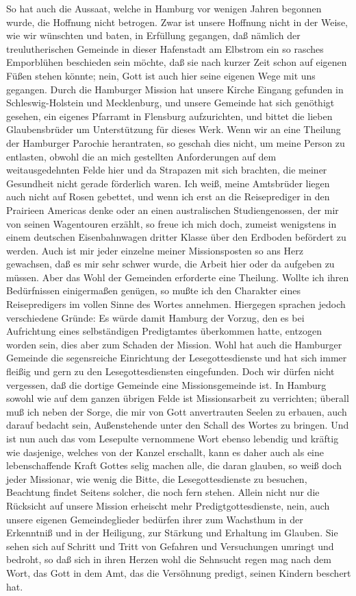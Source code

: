 So hat auch die Aussaat, welche in Hamburg vor wenigen Jahren begonnen wurde, die Hoffnung nicht betrogen. Zwar ist unsere Hoffnung nicht in der Weise, wie wir wünschten und baten, in Erfüllung gegangen, daß nämlich der treulutherischen Gemeinde in dieser Hafenstadt am Elbstrom ein so rasches Emporblühen beschieden sein möchte, daß sie nach kurzer Zeit schon auf eigenen Füßen stehen könnte; nein, Gott ist auch hier seine eigenen Wege mit uns gegangen. Durch die Hamburger Mission hat unsere Kirche Eingang gefunden in Schleswig-Holstein und Mecklenburg, und unsere Gemeinde hat sich genöthigt gesehen, ein eigenes Pfarramt in Flensburg aufzurichten, und bittet die lieben Glaubensbrüder um Unterstützung für dieses Werk. Wenn wir an eine Theilung der Hamburger Parochie herantraten, so geschah dies nicht, um meine Person zu entlasten, obwohl die an mich gestellten Anforderungen auf dem weitausgedehnten Felde hier und da Strapazen mit sich brachten, die meiner Gesundheit nicht gerade förderlich waren. Ich weiß, meine Amtsbrüder liegen auch nicht auf Rosen gebettet, und wenn ich erst an die Reiseprediger in den Prairieen Americas denke oder an einen australischen Studiengenossen, der mir von seinen Wagentouren erzählt, so freue ich mich doch, zumeist wenigstens in einem deutschen Eisenbahnwagen dritter Klasse über den Erdboden befördert zu werden. Auch ist mir jeder einzelne meiner Missionsposten so ans Herz gewachsen, daß es mir sehr schwer wurde, die Arbeit hier oder da aufgeben zu müssen. Aber das Wohl der Gemeinden erforderte eine Theilung. Wollte ich ihren Bedürfnissen einigermaßen genügen, so mußte ich den Charakter eines Reisepredigers im vollen Sinne des Wortes annehmen. Hiergegen sprachen jedoch verschiedene Gründe: Es würde damit Hamburg der Vorzug, den es bei Aufrichtung eines selbständigen Predigtamtes überkommen hatte, entzogen worden sein, dies aber zum Schaden der Mission. Wohl hat auch die Hamburger Gemeinde die segensreiche Einrichtung der Lesegottesdienste und hat sich immer fleißig und gern zu den Lesegottesdiensten eingefunden. Doch wir dürfen nicht vergessen, daß die dortige Gemeinde eine Missionsgemeinde ist. In Hamburg sowohl wie auf dem ganzen übrigen Felde ist Missionsarbeit zu verrichten; überall muß ich neben der Sorge, die mir von Gott anvertrauten Seelen zu erbauen, auch darauf bedacht sein, Außenstehende unter den Schall des Wortes zu bringen. Und ist nun auch das vom Lesepulte vernommene Wort ebenso lebendig und kräftig wie dasjenige, welches von der Kanzel erschallt, kann es daher auch als eine lebenschaffende Kraft Gottes selig machen alle, die daran glauben, so weiß doch jeder Missionar, wie wenig die Bitte, die Lesegottesdienste zu besuchen, Beachtung findet Seitens solcher, die noch fern stehen. Allein nicht nur die Rücksicht auf unsere Mission erheischt mehr Predigtgottesdienste, nein, auch unsere eigenen Gemeindeglieder bedürfen ihrer zum Wachsthum in der Erkenntniß und in der Heiligung, zur Stärkung und Erhaltung im Glauben. Sie sehen sich auf Schritt und Tritt von Gefahren und Versuchungen umringt und bedroht, so daß sich in ihren Herzen wohl die Sehnsucht regen mag nach dem Wort, das Gott in dem Amt, das die Versöhnung predigt, seinen Kindern beschert hat.

